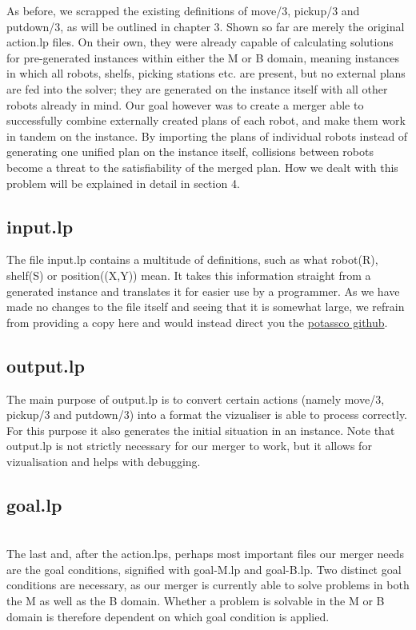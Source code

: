 \documentclass{llncs}
\begin{document}
As before, we scrapped the existing definitions of move/3, pickup/3 and putdown/3, as will be outlined in chapter 3.\newline\newline
Shown so far are merely the original action.lp files. On their own, they were already capable of calculating solutions for pre-generated instances within either the M or B domain, meaning  instances in which all robots, shelfs, picking stations etc. are present, but no external plans are fed into the solver; they are generated on the instance itself with all other robots already in mind. Our goal however was to create a merger able to successfully combine externally created plans of each robot, and make them work in tandem on the instance. By importing the plans of individual robots instead of generating one unified plan on the instance itself, collisions between robots become a threat to the satisfiability of the merged plan.\newline
How we dealt with this problem will be explained in detail in section 4.

\subsection{input.lp}
The file input.lp contains a multitude of definitions, such as what robot(R), shelf(S) or position((X,Y)) mean. It takes this information straight from a generated instance and translates it for easier use by a programmer. As we have made no changes to the file itself and seeing that it is somewhat large, we refrain from providing a copy here and would instead direct you the \hyperlink{thesentence}{potassco github}.

\subsection{output.lp}

The main purpose of output.lp is to convert certain actions (namely move/3, pickup/3 and putdown/3) into a format the vizualiser is able to process correctly. For this purpose it also generates the initial situation in an instance. Note that output.lp is not strictly necessary for our merger to work, but it allows for vizualisation and helps with debugging.

\subsection{goal.lp}\hfill\\
The last and, after the action.lps, perhaps most important files our merger needs are the goal conditions, signified with goal-M.lp and goal-B.lp. Two distinct goal conditions are necessary, as our merger is currently able to solve problems in both the M as well as the B domain. Whether a problem is solvable in the M or B domain is therefore dependent on which goal condition is applied.
\end{document}
